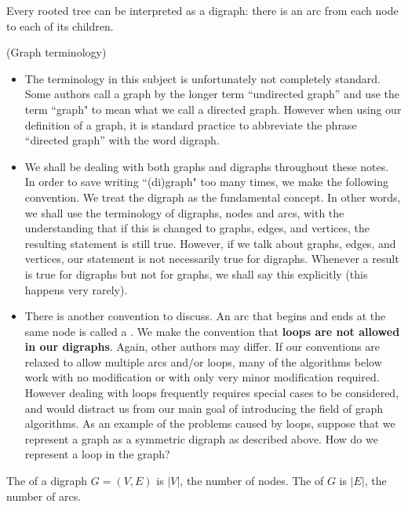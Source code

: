 \begin{Example}
Every  rooted tree can be interpreted as a digraph: there is an arc from
each node to each of its children. 
\end{Example}

\begin{note}(Graph terminology)
\begin{itemize}
\item
The terminology in this subject is unfortunately not completely
standard. Some authors call a graph by the longer term ``undirected
graph'' and use the term ``graph" to mean what we call a directed graph.
However when using our definition of a graph,  it is
standard practice to abbreviate the phrase ``directed graph'' with the word digraph.
\item
We shall be dealing with both graphs and digraphs throughout these
notes. In order to save writing ``(di)graph" too many times, we make the
following convention.  We treat the digraph as the fundamental concept.
In other words, we shall use the terminology of digraphs, nodes and
arcs, with the understanding that if this is changed to graphs, edges,
and vertices, the resulting statement is still true. However, if we talk
about graphs, edges, and vertices, our statement is not necessarily true
for digraphs. Whenever a result is true for digraphs but not for graphs,
we shall say this explicitly (this happens very rarely).
\item
There is another convention to discuss. An arc that begins and ends at
the same node is called a . We make the convention that
\textbf{loops are not allowed in our digraphs}. Again, other authors may
differ. If our conventions are relaxed to allow multiple arcs and/or
loops, many of the algorithms below work with no modification or with
only very minor modification required. However dealing with loops
frequently requires special cases to be considered, and  would distract
us from our main goal of introducing the field of graph algorithms. As
an example of the problems caused by loops, suppose that we represent a
graph as a symmetric digraph as described above. How do we represent a loop in
 the graph?
\end{itemize}
\end{note}


\begin{Definition} 
The  of a digraph $G=(V,E)$ is $|V|$, the number of nodes. 
The  of $G$ is $|E|$, the number of arcs.

\end{Definition}


